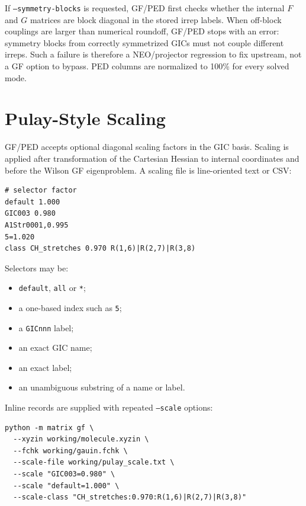 \documentclass[11pt]{article}
\begin{document}
\noindent
If \texttt{--symmetry-blocks} is requested, GF/PED first checks whether the
internal \(F\) and \(G\) matrices are block diagonal in the stored irrep labels.
When off-block couplings are larger than numerical roundoff, GF/PED stops with
an error: symmetry blocks from correctly symmetrized GICs must not couple
different irreps.  Such a failure is therefore a NEO/projector regression to
fix upstream, not a GF option to bypass.  PED columns are normalized to 100\%
for every solved mode.

\section{Pulay-Style Scaling}

GF/PED accepts optional diagonal scaling factors in the GIC basis.  Scaling is
applied after transformation of the Cartesian Hessian to internal coordinates
and before the Wilson GF eigenproblem.  A scaling file is line-oriented text or
CSV:

\begin{lstlisting}[style=oracle]
# selector factor
default 1.000
GIC003 0.980
A1Str0001,0.995
5=1.020
class CH_stretches 0.970 R(1,6)|R(2,7)|R(3,8)
\end{lstlisting}

\noindent
Selectors may be:

\begin{itemize}
  \item \texttt{default}, \texttt{all} or \texttt{*};
  \item a one-based index such as \texttt{5};
  \item a \texttt{GICnnn} label;
  \item an exact GIC name;
  \item an exact label;
  \item an unambiguous substring of a name or label.
\end{itemize}

\noindent
Inline records are supplied with repeated \texttt{--scale} options:

\begin{lstlisting}[style=oracle]
python -m matrix gf \
  --xyzin working/molecule.xyzin \
  --fchk working/gauin.fchk \
  --scale-file working/pulay_scale.txt \
  --scale "GIC003=0.980" \
  --scale "default=1.000" \
  --scale-class "CH_stretches:0.970:R(1,6)|R(2,7)|R(3,8)"
\end{lstlisting}
\end{document}
